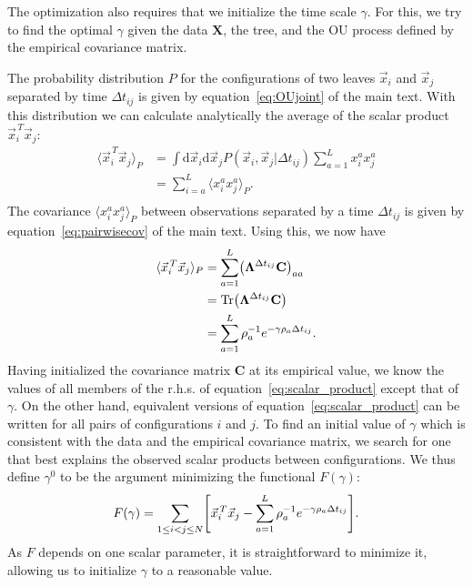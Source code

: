 \documentclass[preprint,amsmath,amssymb,superscriptaddress,showpacs,pre]{revtex4-1}
\let\originalleft\left
\let\originalright\right
\renewcommand{\left}{\mathopen{}\mathclose\bgroup\originalleft}
\renewcommand{\right}{\aftergroup\egroup\originalright}
\def\vx{\vec x}
\DeclareMathOperator{\Tr}{Tr}
\newcommand{\ddroit}{\textrm{d}}
\newcommand{\Lam}{\bm{\Lambda}}
\begin{document}
	The optimization also requires that we initialize the time scale $\gamma$. 
	For this, we try to find the optimal $\gamma$ given the data $\mathbf{X}$, the tree, and the OU process defined by the empirical covariance matrix. 

	The probability distribution $P$ for the configurations of two leaves $\vx_i$ and  $\vx_j$  separated by time $\Delta t_{ij}$ is given by equation~\eqref{eq:OUjoint} of the main text. 
	With this distribution we can calculate analytically the average of the scalar product $\vx_i^{\,T}\vx_j$:
	\begin{align*}
		\langle \vx_i^{\,T}\vx_j \rangle_P &= \int \ddroit \vx_i \ddroit \vx_j P(\vx_i,\vx_j|\Delta t_{ij}) \sum_{a=1}^L   x_i^{a}x_j^{a}  \\
		&=\sum_{i=a}^L \langle  x_i^{a} x_j^a \rangle_{P}.\\
	\end{align*}
	The covariance $\langle  x_i^{a} x_j^a \rangle_{P}$ between observations separated by a time $\Delta t_{ij}$ is given by equation~\eqref{eq:pairwisecov} of the main text.
	Using this, we now have
	\begin{align}
		\nonumber\langle \vx_i^{\,T}\vx_j \rangle_P &= \sum_{a=1}^L \left( \Lam^{\Delta t_{ij}} \mathbf{C} \right)_{aa}\\
		\nonumber&= \Tr\left( \Lam^{\Delta t_{ij}} \mathbf{C} \right)\\
		&= \sum_{a=1}^L \rho_a^{-1}e^{-\gamma\rho_a\Delta t_{ij}}.
		\label{eq:scalar_product}
	\end{align}
	Having initialized the covariance matrix $\mathbf{C}$ at its empirical value, we know the values of all members of the r.h.s. of equation~\eqref{eq:scalar_product} except that of $\gamma$. 
	On the other hand, equivalent versions of equation~\eqref{eq:scalar_product} can be written for all pairs of configurations $i$ and $j$. 
	To find an initial value of $\gamma$ which is consistent with the data and the empirical covariance matrix, we search for one that best explains the observed scalar products between configurations. 
	We thus define $\gamma^0$ to be the argument minimizing the functional $F(\gamma)$: 
	\begin{equation}
	 	F(\gamma) = \sum_{1\leq i<j\leq N}\left[ \vx_i^{\,T}\vx_j - \sum_{a=1}^L \rho_a^{-1}e^{-\gamma\rho_a\Delta t_{ij}} \right].
	\end{equation} 
	As $F$ depends on one scalar parameter, it is straightforward to minimize it, allowing us to initialize $\gamma$ to a reasonable value.
\end{document}

